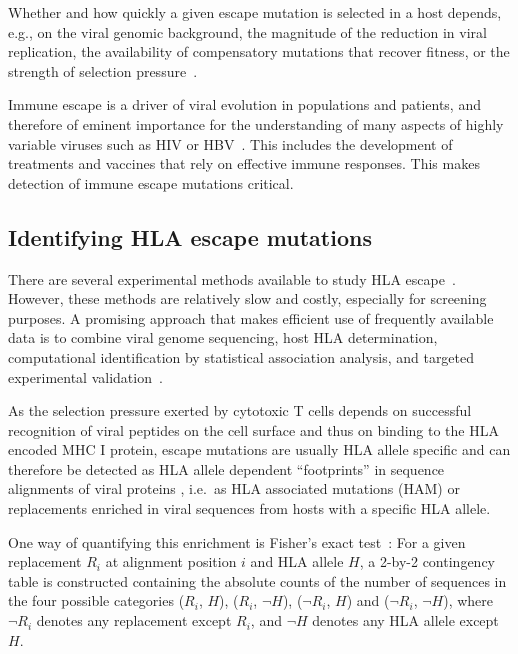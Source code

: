 \documentclass{bioinfo}
\begin{document}
Whether and how quickly a given escape mutation is selected in a host depends, e.g., on the viral genomic background, the magnitude of the reduction in viral replication, the availability of compensatory mutations that recover fitness, or the strength of selection pressure~\citep{Kloverpris2016}.

Immune escape is a driver of viral evolution in populations and patients, and therefore of eminent importance for the understanding of many aspects of highly variable viruses such as HIV or HBV~\citep{Alizon2011, Allen2005, Rousseau2008, Lumley2018}. This includes the development of treatments and vaccines that rely on effective immune responses. This makes detection of immune escape mutations critical.

\subsection{Identifying HLA escape mutations}

There are several experimental methods available to study HLA escape~\citep{Czerkinsky1983, Brunner1968, Lamoreaux2006, Altman1996}. However, these methods are relatively slow and costly, especially for screening purposes. A promising approach that makes efficient use of frequently available data is to combine viral genome sequencing, host HLA determination, computational identification by statistical association analysis, and targeted experimental validation~\citep{Carlson2012}.

As the selection pressure exerted by cytotoxic T cells depends on successful recognition of viral peptides on the cell surface and thus on binding to the HLA encoded MHC I protein, escape mutations are usually HLA allele specific and can therefore be detected as HLA allele dependent ``footprints'' in sequence alignments of viral proteins  \citep{Moore2002}, i.e.\ as HLA associated mutations (HAM) or replacements enriched in viral sequences from hosts with a specific HLA allele.

One way of quantifying this enrichment is Fisher's exact test~\citep{Fisher1922}: For a given replacement \(R_{i}\) at alignment position \(i\) and HLA allele \(H\), a 2-by-2 contingency table is constructed containing the absolute counts of the number of sequences in the four possible categories  (\(R_{i}\), \(H\)), (\(R_{i}\), \(\neg H\)), (\(\neg R_{i}\), \(H\)) and (\(\neg R_{i}\), \(\neg H\)), where \(\neg R_{i}\) denotes any replacement except \(R_{i}\), and \(\neg H\) denotes any HLA allele except \(H\).
\end{document}
